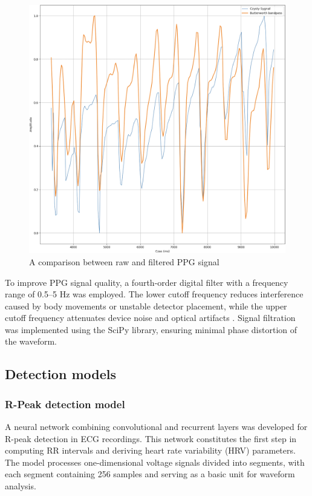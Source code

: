 \documentclass[journal]{IEEEtran}
\begin{document}
\begin{figure}[htbp]
    \centering
    \includegraphics[width=0.76\linewidth]{Filtr_PPG.png} 
    \caption{A comparison between raw and filtered PPG signal}
    \label{fig:filtr_ppg}
\end{figure}

To improve PPG signal quality, a fourth-order digital filter with a frequency range of 0.5–5 Hz was employed. The lower cutoff frequency reduces interference caused by body movements or unstable detector placement, while the upper cutoff frequency attenuates device noise and optical artifacts \cite{26}. Signal filtration was implemented using the SciPy library, ensuring minimal phase distortion of the waveform.

\newpage
\subsection{Detection models}
\subsubsection{R-Peak detection model}
A neural network combining convolutional and recurrent layers was developed for R-peak detection in ECG recordings. This network constitutes the first step in computing RR intervals and deriving heart rate variability (HRV) parameters. The model processes one-dimensional voltage signals divided into segments, with each segment containing 256 samples and serving as a basic unit for waveform analysis.
\end{document}
